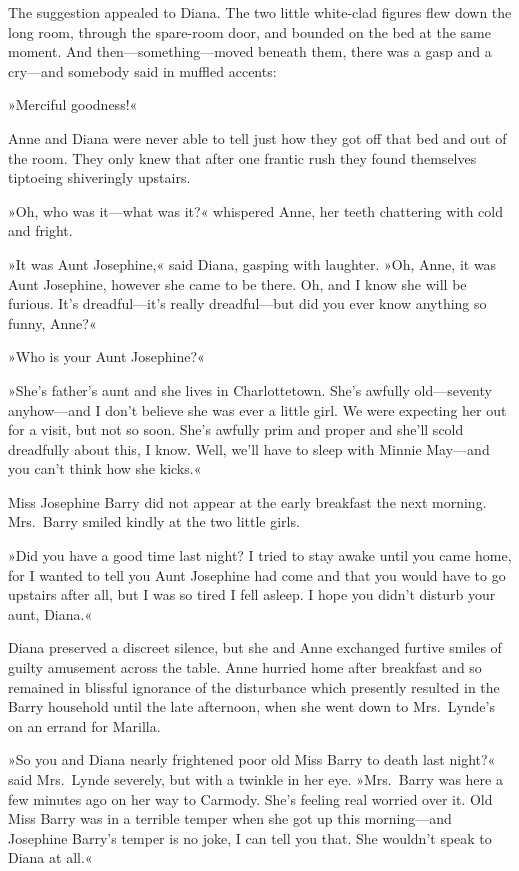The suggestion appealed to Diana. The two little white-clad figures flew down the long room, through the spare-room door, and bounded on the bed at the same moment. And then—something—moved beneath them, there was a gasp and a cry—and somebody said in muffled accents:

»Merciful goodness!«

Anne and Diana were never able to tell just how they got off that bed and out of the room. They only knew that after one frantic rush they found themselves tiptoeing shiveringly upstairs.

»Oh, who was it—what was it?« whispered Anne, her teeth chattering with cold and fright.

»It was Aunt Josephine,« said Diana, gasping with laughter. »Oh, Anne, it was Aunt Josephine, however she came to be there. Oh, and I know she will be furious. It's dreadful—it's really dreadful—but did you ever know anything so funny, Anne?«

»Who is your Aunt Josephine?«

»She's father's aunt and she lives in Charlottetown. She's awfully old—seventy anyhow—and I don't believe she was ever a little girl. We were expecting her out for a visit, but not so soon. She's awfully prim and proper and she'll scold dreadfully about this, I know. Well, we'll have to sleep with Minnie May—and you can't think how she kicks.«

Miss Josephine Barry did not appear at the early breakfast the next morning. Mrs.~Barry smiled kindly at the two little girls.

»Did you have a good time last night? I tried to stay awake until you came home, for I wanted to tell you Aunt Josephine had come and that you would have to go upstairs after all, but I was so tired I fell asleep. I hope you didn't disturb your aunt, Diana.«

Diana preserved a discreet silence, but she and Anne exchanged furtive smiles of guilty amusement across the table. Anne hurried home after breakfast and so remained in blissful ignorance of the disturbance which presently resulted in the Barry household until the late afternoon, when she went down to Mrs.~Lynde's on an errand for Marilla.

»So you and Diana nearly frightened poor old Miss Barry to death last night?« said Mrs.~Lynde severely, but with a twinkle in her eye. »Mrs.~Barry was here a few minutes ago on her way to Carmody. She's feeling real worried over it. Old Miss Barry was in a terrible temper when she got up this morning—and Josephine Barry's temper is no joke, I can tell you that. She wouldn't speak to Diana at all.«

